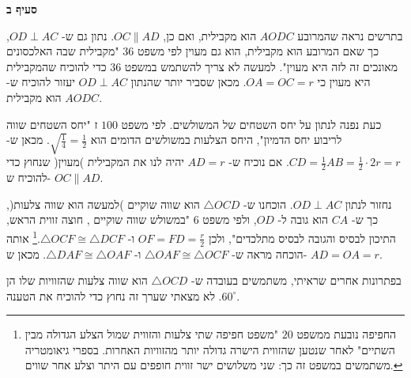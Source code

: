 \textbf{סעיף ב}

בתרשים נראה שהמרובע
$AODC$
הוא מקבילית, ואם כן, 
$OC\|AD$.
נתון גם ש-%
$OD\perp AC$,
כך שאם המרובע הוא מקבילית, הוא גם מעוין לפי משפט
$36$
"מקבילית שבה האלכסונים מאונכים זה לזה היא מעוין". למעשה לא צריך להשתמש במשפט
$36$
כדי להוכיח שהמקבילית היא מעוין כי 
$OA=OC=r$.
מכאן שסביר יותר שהנתון
$OD\perp AC$
יעזור להוכיח ש-%
$AODC$
הוא מקבילית.

כעת נפנה לנתון על יחס השטחים של המשולשים. לפי משפט
$100$%
ז "יחס השטחים שווה לריבוע יחס הדמיון", היחס הצלעות במשולשים הדומים הוא
$\sqrt{\frac{1}{4}}=\frac{1}{2}$.
מכאן ש-%
$CD=\frac{1}{2}AB=\frac{1}{2}\cdot 2r=r$.
אם נוכיח ש-%
$AD=r$
יהיה לנו את המקבילית )מעוין( שנחוץ כדי להוכיח ש-%
$OC\|AD$.

נחזור לנתון
$OD\perp AC$.
הוכחנו ש-%
$\triangle OCD$
הוא שווה שוקיים )למעשה הוא שווה צלעות(, כך ש-%
$CA$
הוא גובה ל-%
$OD$,
ולפי משפט
$6$
"במשולש שווה שוקיים , חוצה זווית הראש, התיכון לבסיס והגובה לבסיס מתלכדים", ולכן
$OF=FD=\frac{r}{2}$
ו-%
$\triangle OCF\cong\triangle DCF$.\footnote{%
החפיפה נובעת ממשפט 
$20$
"משפט חפיפה שתי צלעות והזווית שמול הצלע הגדולה מבין השתיים" לאחר שנטען שהזווית הישרה גדולה יותר מהזוויות האחרות. בספרי גיאומטריה משתמשים במשפט זה כך: שני משלושים ישר זווית חופפים עם היתר וצלע אחר שווים.%
}
אותה הוכחה מראה ש-%
$\triangle OAF\cong \triangle OCF$
ו-%
$\triangle DAF\cong \triangle OAF$.
מכאן ש-%
$AD=OA=r$.
\begin{center}
\end{center}
בפתרונות אחרים שראיתי, משתמשים בעובדה ש-%
$\triangle OCD$
הוא שווה צלעות שהזוויות שלו הן
$60^\circ$.
לא מצאתי שערך זה נחוץ כדי להוכיח את הטענה.

